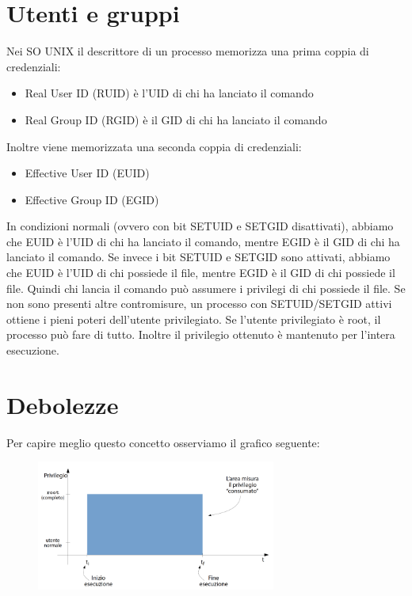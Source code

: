 \section{Utenti e gruppi}
Nei SO UNIX il descrittore di un processo memorizza una prima coppia di credenziali:
\begin{itemize}
    \item Real User ID (RUID) è l'UID di chi ha lanciato il comando
    \item Real Group ID (RGID) è il GID di chi ha lanciato il comando
\end{itemize}
Inoltre viene memorizzata una seconda coppia di credenziali:
\begin{itemize}
    \item Effective User ID (EUID)
    \item Effective Group ID (EGID)
\end{itemize}
In condizioni normali (ovvero con bit SETUID e SETGID disattivati), abbiamo che EUID è l'UID di chi ha lanciato il comando, mentre EGID è il GID di chi ha lanciato il comando. Se invece i bit SETUID e SETGID sono attivati, abbiamo che EUID è l'UID di chi possiede il file, mentre EGID è il GID di chi possiede il file. Quindi chi lancia il comando può assumere i privilegi di chi possiede il file. Se non sono presenti altre contromisure, un processo con SETUID/SETGID attivi ottiene i pieni poteri dell'utente privilegiato. Se l'utente privilegiato è root, il processo può fare di tutto. Inoltre il privilegio ottenuto è mantenuto per l'intera esecuzione. 

\section{Debolezze}
Per capire meglio questo concetto osserviamo il grafico seguente:

\begin{figure}[hbpt!]
    \centering
    \includegraphics[width=0.7\textwidth]{./Images/cap4/4.1.png}
\end{figure}
\FloatBarrier

